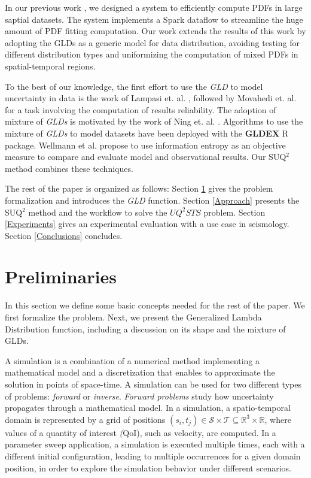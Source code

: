 \documentclass[11pt]{article}
\begin{document}
In our previous work \cite{Liu2019}, we designed a system to efficiently compute PDFs in large saptial datasets. The system implements a Spark dataflow to streamline the huge amount of PDF fitting computation. Our work extends the results of this work by adopting the GLDs as a generic model for data distribution, avoiding testing for different distribution types and uniformizing the computation of mixed PDFs in spatial-temporal regions. 

To the best of our knowledge, the first effort to use the \textit{GLD} to model uncertainty in data is the work of Lampasi et. al. \cite{Lampasi2006}, followed by Movahedi et. al. \cite{Movahedi2013} for a  task involving the computation of results reliability. The adoption of mixture of \textit{GLDs} is motivated by the work of Ning et. al. \cite{Ning2008}. Algorithms to use the mixture of \textit{GLDs} to model datasets have been deployed with the \textbf{GLDEX} R package.
Wellmann et al. \cite{Wellmann2012} propose to use information entropy as an objective measure to compare and evaluate model and observational results. Our SUQ$^2$ method combines these techniques.

The rest of the paper is organized as follows: Section \ref{UQBackground} gives the problem formalization and introduces the \textit{GLD} function.  Section \ref{Approach} presents the SUQ$^2$ method and the workflow to solve the $UQ^2STS$ problem. Section \ref{Experiments} gives an experimental evaluation
with a use case in seismology.
Section \ref{Conclusions} concludes.


\section{Preliminaries}
\label{UQBackground}
In this section we define some basic concepts needed for the rest of the paper. We first formalize the problem. Next, we present the Generalized Lambda Distribution function, including a discussion on its shape and the mixture of GLDs.

A simulation is a combination of a numerical method implementing a mathematical model and a discretization that enables to approximate the solution in points of space-time. A simulation can be used for two different types of problems: \textit{forward} or \textit{inverse}. \textit{Forward problems} study how uncertainty propagates through a mathematical model. In a simulation, a spatio-temporal domain is represented by a grid of positions $(s_{i},t_{j}) \in \mathcal{S} \times \mathcal{T}\subseteq\mathbb{R}^{3}\times\mathbb{R}$, where values of a quantity of interest \textit(QoI), such as velocity, are computed. In a parameter sweep application, a simulation is executed multiple times, each with a different initial configuration, leading to multiple occurrences for a given domain position, in order to explore the simulation behavior under different scenarios.
\end{document}
